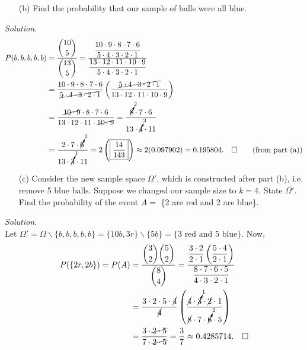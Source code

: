 \documentclass[12pt]{report}
\begin{document}
\begin{itemize}
\item [(b)] Find the probability that our sample of balls were all blue.					%
\end{itemize}
\textit{Solution. } \\
\begin{align*}
P(b,b,b,b,b)&=\frac{\displaystyle{10\choose5}}{\displaystyle{13\choose5}}=\dfrac{\dfrac{10\cdot9\cdot8\cdot7\cdot6}{5\cdot4\cdot3\cdot2\cdot1}}{\dfrac{13\cdot12\cdot11\cdot10\cdot9}{5\cdot4\cdot3\cdot2\cdot1}}\\
&=\dfrac{10\cdot9\cdot8\cdot7\cdot6}{\cancel{5\cdot4\cdot3\cdot2\cdot1}}\left(\dfrac{\cancel{5\cdot4\cdot3\cdot2\cdot1}}{13\cdot12\cdot11\cdot10\cdot9}\right)\\
&=\dfrac{\cancel{10\cdot9}\cdot8\cdot7\cdot6}{13\cdot12\cdot11\cdot\cancel{10\cdot9}}=\dfrac{\cancelto{2}{8}\cdot7\cdot6}{13\cdot\cancelto{3}{4}\cdot11}\\
&=\dfrac{2\cdot7\cdot\cancelto{2}{6}}{13\cdot\cancelto{1}{3}\cdot11}=2\left(\boxed{\dfrac{14}{143}}\right) \approx 2(0.097902)=0.195804.~~~\square \tag{from part (a)}
\end{align*}

\begin{itemize}
\item [(c)] Consider the new sample space $\Omega'$, which is constructed after part (b), i.e. remove 5 blue balls. Suppose we changed our sample size to $k=4$. State $\Omega'$. Find the probability of the event $A=$ \{2 are red and 2 are blue\}.   %
\end{itemize}
\textit{Solution. } \\
Let $\Omega'=\Omega\backslash\{b,b,b,b,b\}=\{10b,3r\}\backslash\{5b\}=\{\text{3 red and 5 blue}\}$.
Now,
\begin{align*}
P(\{2r,2b\})=P(A)&=\dfrac{\displaystyle{3\choose2}{5\choose2}}{\displaystyle{8\choose4}}=\dfrac{\dfrac{3\cdot2}{2\cdot1}\left(\dfrac{5\cdot4}{2\cdot1}\right)}{\dfrac{8\cdot7\cdot6\cdot5}{4\cdot3\cdot2\cdot1}}\\
&=\dfrac{3\cdot2\cdot5\cdot\cancel{4}}{\cancel{4}}\left( \dfrac{\cancel{4}\cdot\cancelto{1}{3}\cdot\cancel{2}\cdot1}{\cancel{8}\cdot7\cdot\cancelto{2}{6}\cdot5} \right)\\
&=\dfrac{3\cdot\cancel{2\cdot5}}{7\cdot\cancel{2\cdot5}}=\dfrac{3}{7}\approx0.4285714.~~~\square
\end{align*}
\end{document}
